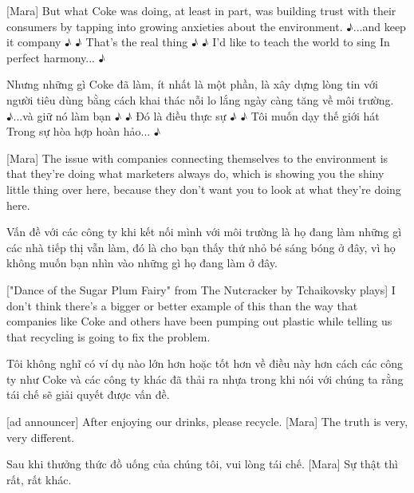 \documentclass[a4paper]{article}
\begin{document}
	[Mara] But what Coke was doing, at least in part, was building trust with their consumers by tapping into growing anxieties about the environment.
	♪...and keep it company ♪
	♪ That's the real thing ♪
	♪ I'd like to teach the world to sing In perfect harmony... ♪
	
	\begin{vietnamese-v2}
		[Mara] Nhưng những gì Coke đã làm, ít nhất là một phần, là xây dựng lòng tin với người tiêu dùng bằng cách khai thác nỗi lo lắng ngày càng tăng về môi trường.
		♪...và giữ nó làm bạn ♪
		♪ Đó là điều thực sự ♪
		♪ Tôi muốn dạy thế giới hát Trong sự hòa hợp hoàn hảo... ♪
	\end{vietnamese-v2}
	
	[Mara] The issue with companies connecting themselves to the environment is that they're doing what marketers always do, which is showing you the shiny little thing over here, because they don't want you to look at what they're doing here.
	
	\begin{vietnamese-v2}
		[Mara] Vấn đề với các công ty khi kết nối mình với môi trường là họ đang làm những gì các nhà tiếp thị vẫn làm, đó là cho bạn thấy thứ nhỏ bé sáng bóng ở đây, vì họ không muốn bạn nhìn vào những gì họ đang làm ở đây.
	\end{vietnamese-v2}
	
	["Dance of the Sugar Plum Fairy" from The Nutcracker by Tchaikovsky plays]
	I don't think there's a bigger or better example of this than the way that companies like Coke and others have been pumping out plastic while telling us that recycling is going to fix the problem.
	
	\begin{vietnamese-v2}
		Tôi không nghĩ có ví dụ nào lớn hơn hoặc tốt hơn về điều này hơn cách các công ty như Coke và các công ty khác đã thải ra nhựa trong khi nói với chúng ta rằng tái chế sẽ giải quyết được vấn đề.
	\end{vietnamese-v2}
	
	[ad announcer] After enjoying our drinks, please recycle.
	[Mara] The truth is very, very different.
	
	\begin{vietnamese-v2}
		 Sau khi thưởng thức đồ uống của chúng tôi, vui lòng tái chế.
		[Mara] Sự thật thì rất, rất khác.	
	\end{vietnamese-v2}
	
\end{document}
